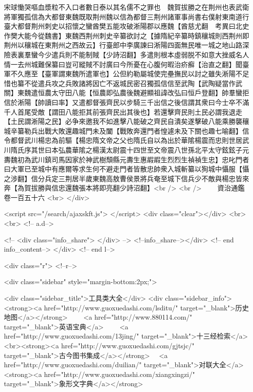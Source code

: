 宋球慟哭嘔血漿粒不入口者數日泰以其名儒不之罪也　魏賀拔勝之在荆州也表武衛將軍獨孤信為大都督東魏既取荆州魏以信為都督三荆州諸軍事尚書右僕射東南道行臺大都督荆州刺史以招懷之蠻酋樊五能攻破淅陽郡以應魏【酋慈尤翻　考異曰北史作樊大能今從魏書】東魏西荆州刺史辛纂欲討之【據隋紀辛纂時鎮穰城則西荆州即荆州以穰城在東荆州之西故云】行臺郎中李廣諫曰淅陽四面無民唯一城之地山路深險表裏羣蠻今少遣兵則不能制賊【少詩沼翻】多遣則根本虛弱脱不如意大挫威名人情一去州城難保纂曰豈可縱賊不討廣曰今所憂在心腹何暇治疥癬【治直之翻】聞臺軍不久應至【臺軍謂東魏所遣軍也】公但約勒屬城使完壘撫民以討之雖失淅陽不足惜也纂不從遣兵攻之兵敗諸將因亡不返城民密召獨孤信信至武陶【武陶疑當作武關】東魏遣恒農太守田八能【恒農即弘農後魏避顯祖諱改弘曰恒戶登翻】帥羣蠻拒信於淅陽【帥讀曰率】又遣都督張齊民以步騎三千出信之後信謂其衆曰今士卒不滿千人首尾受敵【謂田八能拒其前張齊民出其後也】若還擊齊民則土民必謂我退走【土民謂淅陽之民】必争來邀我不如進擊八能破之齊民自潰矣遂擊破八能乘勝襲穰城辛纂勒兵出戰大敗還趣城門未及闔【戰敗奔還門者惶遽未及下關也趣七喻翻】信令都督武川楊忠為前驅【楊忠隋文帝之父也隋氏自以為出於華隂楊震而忠則世居武川隋氏序其世曰本弘農華隂之楊漢太尉震十四世至文帝震八世孫北平太守鉉鉉子元夀魏初為武川鎮司馬因家於神武樹頹縣元夀生惠嘏嘏生烈烈生禎禎生忠】忠叱門者曰大軍已至城中有應爾等求生何不避走門者皆散忠帥衆入城斬纂以狥城中懾服【懾之涉翻】信分兵定三荆居半歲東魏高敖曹侯景將兵奄至城下信兵少不敵與楊忠皆來奔【為賀拔勝與信忠還魏張本將即亮翻少詩沼翻】<br />
<br />
　　資治通鑑卷一百五十六  <br>
   </div> 

<script src="/search/ajaxskft.js"> </script>
 <div class="clear"></div>
<br>
<br>
 <!-- a.d-->

 <!--
<div class="info_share">
</div> 
-->
 <!--info_share--></div>   <!-- end info_content-->
  </div> <!-- end l-->

<div class="r">   <!--r-->



<div class="sidebar"  style="margin-bottom:2px;">

 
<div class="sidebar_title">工具类大全</div>
<div class="sidebar_info">
<strong><a href="http://www.guoxuedashi.com/lsditu/" target="_blank">历史地图</a></strong>　　
<a href="http://www.880114.com/" target="_blank">英语宝典</a>　　
<a href="http://www.guoxuedashi.com/13jing/" target="_blank">十三经检索</a>　
<br><strong><a href="http://www.guoxuedashi.com/gjtsjc/" target="_blank">古今图书集成</a></strong>　
<a href="http://www.guoxuedashi.com/duilian/" target="_blank">对联大全</a>　<strong><a href="http://www.guoxuedashi.com/xiangxingzi/" target="_blank">象形文字典</a></strong>　

